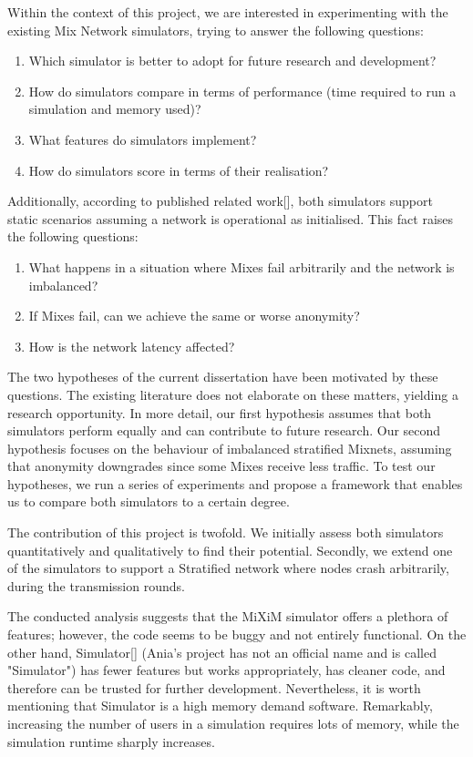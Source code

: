 \documentclass[logo,msc,cyber]{infthesis}   %
\begin{document}
Within the context of this project, we are interested in experimenting with the
existing Mix Network simulators, trying to answer the following questions:  

\begin{enumerate}
   \item Which simulator is better to adopt for future research and development?
   \item How do simulators compare in terms of performance (time required to run a simulation and memory used)?
   \item What features do simulators implement?
   \item How do simulators score in terms of their realisation?
\end{enumerate}
 
Additionally, according to published related work[], both simulators support
static scenarios assuming a network is operational as initialised. This fact
raises the following questions:

\begin{enumerate}
   \item What happens in a situation where Mixes fail arbitrarily and the network is imbalanced?
   \item If Mixes fail, can we achieve the same or worse anonymity?
   \item How is the network latency affected?
\end{enumerate}

The two hypotheses of the current dissertation have been motivated by these
questions. The existing literature does not elaborate on these matters, yielding
a research opportunity. In more detail, our first hypothesis assumes that both
simulators perform equally and can contribute to future research. Our second
hypothesis focuses on the behaviour of imbalanced stratified Mixnets, assuming
that anonymity downgrades since some Mixes receive less traffic. To test our
hypotheses, we run a series of experiments and propose a framework that enables
us to compare both simulators to a certain degree.

The contribution of this project is twofold. We initially assess both simulators
quantitatively and qualitatively to find their potential. Secondly, we extend
one of the simulators to support a Stratified network where nodes crash
arbitrarily, during the transmission rounds.

The conducted analysis suggests that the MiXiM simulator offers a plethora of
features; however, the code seems to be buggy and not entirely functional. On
the other hand, Simulator[] (Ania's project has not an official name and is
called "Simulator") has fewer features but works appropriately, has cleaner
code, and therefore can be trusted for further development. Nevertheless, it is
worth mentioning that Simulator is a high memory demand software. Remarkably,
increasing the number of users in a simulation requires lots of memory, while
the simulation runtime sharply increases.
\end{document}
